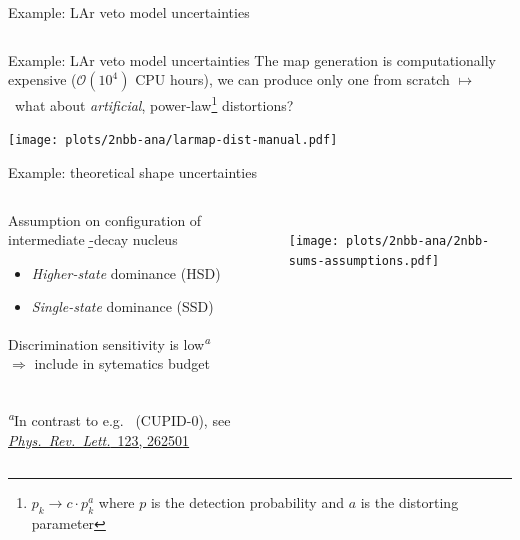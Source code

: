 \documentclass[10pt,aspectratio=169]{beamer}
\newcommand{\arrow}{$\longmapsto$}
\begin{document}
\begin{frame}{Example: LAr veto model uncertainties}
\begin{columns}
\begin{column}{0.15\textwidth}
\begin{center}
      \end{center}
    \end{column}
  \end{columns}
\end{frame}
\begin{frame}{Example: LAr veto model uncertainties}
  The map generation is computationally expensive ($\mathcal{O}{(10^4)}$ CPU
  hours), we can produce only one from scratch \arrow\ what about
  \emph{artificial}, power-law\footnote{$p_k \rightarrow c \cdot p_k^a$ where
  $p$ is the detection probability and $a$ is the distorting parameter}
  distortions?
  \begin{center}
    \texttt{[image: plots/2nbb-ana/larmap-dist-manual.pdf]}
  \end{center}
\end{frame}
\begin{frame}{Example: \texorpdfstring{\nnbb}{2νββ} theoretical shape uncertainties}
  \begin{columns}
    \begin{column}{0.45\textwidth}\setlength{\parskip}{10pt}%
      Assumption on configuration of intermediate \b\b-decay nucleus
      \begin{itemize}
        \item \emph{Higher-state} dominance (\alert{HSD})
        \item \emph{Single-state} dominance (\alert{SSD})
      \end{itemize}
      \begin{simpleblock}
        Discrimination sensitivity is low\textsuperscript{\emph{a}} \\
        $\Rightarrow$ include in sytematics budget
      \end{simpleblock}
      \hrulefill \\
      {\footnotesize \textsuperscript{\emph{a}}In contrast to e.g.~ (CUPID-0), see
      \href{https://doi.org/10.1103/PhysRevLett.123.262501}{\emph{Phys.~Rev.~Lett.}~123, 262501}}
    \end{column}
    \begin{column}{0.55\textwidth}
      \centering
      \vspace*{0.5cm} \\
      \texttt{[image: plots/2nbb-ana/2nbb-sums-assumptions.pdf]}
    \end{column}
  \end{columns}
\end{frame}
\end{document}
